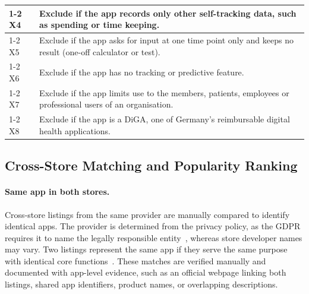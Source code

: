 \begin{table}[!t]
\begin{singlespace}
\begin{tabularx}{\textwidth}{@{}l>{\raggedright\arraybackslash}X@{}}
\cmidrule[0.3pt]{1-2}
X4 & Exclude if the app records only other self-tracking data, such as spending or time
  keeping. \\
\cmidrule[0.3pt]{1-2}
X5 & Exclude if the app asks for input at one time point only and keeps no result (one-off
  calculator or test). \\
\cmidrule[0.3pt]{1-2}
X6 & Exclude if the app has no tracking or predictive feature. \\
\cmidrule[0.3pt]{1-2}
X7 & Exclude if the app limits use to the members, patients, employees or professional users of
  an organisation. \\
\cmidrule[0.3pt]{1-2}
X8 & Exclude if the app is a DiGA, one of Germany's reimbursable digital health applications. \\
\bottomrule
\end{tabularx}
\end{singlespace}
\end{table}

\subsection{Cross-Store Matching and Popularity Ranking}
\label{sec:ranking}
\paragraph{Same app in both stores.} Cross-store listings from the same provider are manually
compared to identify identical apps. The provider is determined from the privacy policy, as the
GDPR requires it to name the legally responsible entity~\parencite[Art.~13(1)(a)]{gdpr2016},
whereas store developer names may vary. Two listings represent the same app if they serve the
same purpose with identical core functions~\parencite[\S3.2, p.~352]{steinboeck2024comparing}.
These matches are verified manually and documented with app-level evidence, such as an official
webpage linking both listings, shared app identifiers, product names, or overlapping
descriptions.

